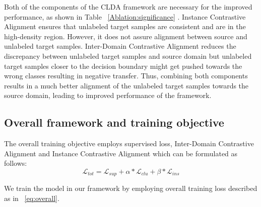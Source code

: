 Both of the components of the CLDA framework are necessary for the improved performance, as shown in Table ~\ref{Ablation:significance} . Instance Contrastive Alignment ensures that unlabeled target samples are consistent and are in the high-density region. However, it does not assure alignment between source and unlabeled target samples. Inter-Domain Contrastive Alignment reduces the discrepancy between unlabeled target samples and source domain but unlabeled target samples closer to the decision boundary might get pushed towards the wrong classes resulting in negative transfer. Thus, combining both components results in a much better alignment of the unlabeled target samples towards the source domain, leading to improved performance of the framework.

\subsection{Overall framework and training objective}
The overall training objective employs supervised loss, Inter-Domain Contrastive Alignment and Instance Contrastive Alignment which can be formulated as follows:
\begin{equation}
    \label{eq:overall}
    \mathcal{L}_{tot} = \mathcal{L}_{sup} + \alpha*\mathcal{L}_{clu} + \beta*\mathcal{L}_{ins}
\end{equation}

We train the model in our framework by employing overall training loss described as in ~\eqref{eq:overall}.

